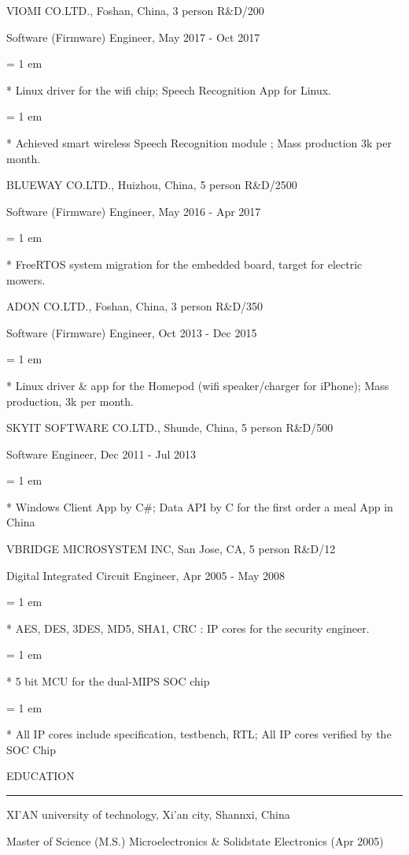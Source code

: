 { \medbreak } { \FFdd
VIOMI CO.LTD., Foshan, China, 3 person R\&D/200
}

{ \FFee
Software (Firmware) Engineer, May 2017 - Oct 2017
}

{ \parindent = 1 em \item{*} 
 Linux driver for the wifi chip; Speech Recognition App for Linux.
 }
{ \parindent = 1 em \item{*} 
 Achieved smart wireless Speech Recognition module ; Mass production 3k per month.
 }

{ \medbreak } { \FFdd
BLUEWAY CO.LTD., Huizhou, China, 5 person R\&D/2500
}

{ \FFee
Software (Firmware) Engineer, May 2016 - Apr 2017
}
{ \parindent = 1 em \item{*} 
 FreeRTOS system migration for the embedded board, target for electric mowers.
 }

{ \medbreak } { \FFdd
ADON CO.LTD., Foshan, China, 3 person R\&D/350
}

{ \FFee
Software (Firmware) Engineer, Oct 2013 - Dec 2015
}
{ \parindent = 1 em \item{*} 
 Linux driver \& app for the Homepod (wifi speaker/charger for iPhone); Mass production, 3k per month.
 }

{ \medbreak } { \FFdd
SKYIT SOFTWARE CO.LTD., Shunde, China, 5 person R\&D/500
}

{ \FFee
Software Engineer, Dec 2011 - Jul 2013
}
{ \parindent = 1 em \item{*} 
 Windows Client App by C\#; Data API by C for the first order a meal App in China
 }

{ \medbreak } { \FFdd
VBRIDGE MICROSYSTEM INC, San Jose, CA, 5 person R\&D/12
}

{ \FFee
Digital Integrated Circuit Engineer, Apr 2005 - May 2008
}
{ \parindent = 1 em \item{*} 
 AES, DES, 3DES, MD5, SHA1, CRC : IP cores for the security engineer. 
 }
{ \parindent = 1 em \item{*} 
 5 bit MCU for the dual-MIPS SOC chip
 }
{ \parindent = 1 em \item{*} 
 All IP cores include specification, testbench, RTL; All IP cores verified by the SOC Chip
 }

{ \medbreak } { \FFdd
EDUCATION
}
{ \smallbreak } {\par\noindent\hrule} { \smallbreak }
XI'AN university of technology, Xi'an city, Shannxi, China

{ \FFee
Master of Science (M.S.) Microelectronics \& Solidstate Electronics (Apr 2005)
}

